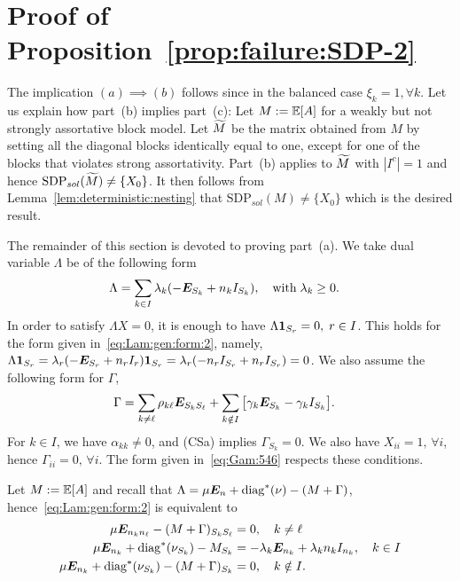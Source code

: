 \section{Proof of Proposition~\ref{prop:failure:SDP-2}}\label{sec:proof:prop:failure:SDP-2}
  The implication $(a)\implies(b)$ follows since in the balanced case $\xi_k = 1, \forall k$.  Let us explain how part~(b) implies part~(c): Let $M := \mathbb{E}[A]$ for a weakly but not strongly assortative block model. Let $\widetilde{M}$ be the matrix obtained from $M$ by setting all the diagonal blocks identically equal to one, except for one of the blocks that violates strong assortativity. Part~(b) applies to $\widetilde{M}$ with $|I^c| = 1$ and hence $\text{SDP}_{sol}(\widetilde{M}) \neq \{X_0\}$. It then follows from Lemma~\ref{lem:deterministic:nesting} that $\text{SDP}_{sol}(M) \neq \{X_0\}$ which is the desired result.

  The remainder of this section is devoted to proving part~(a).
    We take dual variable $\Lambda$ be of the following form
  \begin{align}\label{eq:Lam:gen:form:2}
    \Lambda &= \sum_{k \in I} \lambda_k (- \bm{E}_{S_k} + n_k I_{S_k}),\quad \text{with}\; \lambda_k \ge 0.
  \end{align}
  In order to satisfy $\Lambda X = 0$, it is enough to have $\Lambda \bm{1}_{S_r} = 0, \; r \in I$. This holds for the form given in~\eqref{eq:Lam:gen:form:2}, namely, $\Lambda \bm{1}_{S_r} = \lambda_r (- \bm{E}_{S_r} + n_r I_r) \bm{1}_{S_r} = \lambda_r(-n_r I_{S_r} + n_r I_{S_r}) = 0$. We also assume the following form for $\Gamma$,
  \begin{align}\label{eq:Gam:546}
    \Gamma &= \sum_{k \neq \ell } \rho_{k \ell} \bm{E}_{S_k S_\ell}  + 
    \sum_{k \notin I} \big[ \gamma_k \bm{E}_{S_k} - \gamma_k I_{S_k}\big].
  \end{align}
  For $k \in I$, we have $\alpha_{kk} \neq 0$, and (CSa) implies $\Gamma_{S_k} = 0$. We also have $X_{ii} = 1, \,\forall i$, hence $\Gamma_{ii} = 0, \,\forall i$. The form given in~\eqref{eq:Gam:546} respects these conditions.

  \medskip
  Let $M := \mathbb{E}[A]$ and recall that $\Lambda = \mu \bm{E}_n + \operatorname{diag}^*(\nu)  - (M+\Gamma)$, hence~\eqref{eq:Lam:gen:form:2} is equivalent to 
  \begin{align}
    \mu \bm{E}_{n_k n_\ell} - (M+\Gamma)_{S_k S_\ell} &= 0, \quad k \neq \ell \label{eq:cond:167}\\
    \mu \bm{E}_{n_k} + \operatorname{diag}^*(\nu_{S_k}) - M_{S_k} &= -\lambda_k \bm{E}_{n_k} + \lambda_k n_k I_{n_k}, \quad k \in I \label{eq:cond:267}\\
    \mu \bm{E}_{n_k} + \operatorname{diag}^*(\nu_{S_k}) - (M+\Gamma)_{S_k} &= 0, \quad k \notin I \label{eq:cond:367}.
  \end{align}

